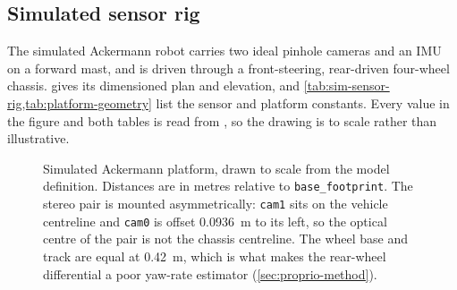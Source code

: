 \subsection{Simulated sensor rig}

The simulated Ackermann robot carries two ideal pinhole cameras and an IMU on a
forward mast, and is driven through a front-steering, rear-driven four-wheel
chassis.  gives its dimensioned plan and elevation, and
\cref{tab:sim-sensor-rig,tab:platform-geometry} list the sensor and platform
constants. Every value in the figure and both tables is read from
, so
the drawing is to scale rather than illustrative.

\begin{figure}[htbp]
  \centering
  \resizebox{\textwidth}{!}{}
  \caption{Simulated Ackermann platform, drawn to scale from the model
  definition. Distances are in metres relative to \texttt{base\_footprint}. The
  stereo pair is mounted asymmetrically: \texttt{cam1} sits on the vehicle
  centreline and \texttt{cam0} is offset \SI{0.0936}{\metre} to its left, so the
  optical centre of the pair is not the chassis centreline. The wheel base and
  track are equal at \SI{0.42}{\metre}, which is what makes the rear-wheel
  differential a poor yaw-rate estimator (\cref{sec:proprio-method}).}
  \label{fig:ackermann-robot}
\end{figure}

